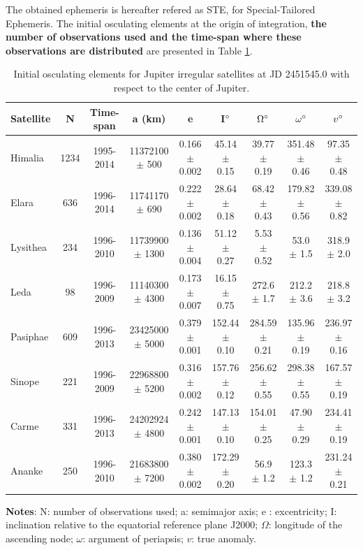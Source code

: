 \documentclass[useAMS,usenatbib]{mn2e}
\begin{document}
The obtained ephemeris is hereafter refered as STE, for Special-Tailored Ephemeris. The initial osculating elements at the origin of integration, \textbf{the number of observations used and the time-span where these observations are distributed} are presented in Table \ref{Tab: sat_ell}.

\begin{table}
\caption{Initial osculating elements for Jupiter irregular satellites at JD 2451545.0 with respect to the center of Jupiter.
 }\label{Tab: sat_ell}
\begin{center}
\begin{tabular}{lcccccccc}
\hline\hline
Satellite & N & Time-span & a (km) & e & I$\hbox{$^\circ$}$ & $\Omega\hbox{$^\circ$}$ & $\omega\hbox{$^\circ$}$ & $v\hbox{$^\circ$}$ \\ 
\hline
Himalia & 1234 & 1995-2014 &   11372100 $\pm$ 500    &    0.166 $\pm$ 0.002      &   45.14 $\pm$ 0.15      &   39.77 $\pm$ 0.19      &   351.48 $\pm$ 0.46      &   97.35 $\pm$ 0.48    \\
Elara & 636 & 1996-2014 &   11741170 $\pm$ 690  &      0.222 $\pm$ 0.002      &   28.64 $\pm$ 0.18      &   68.42 $\pm$ 0.43      &   179.82 $\pm$ 0.56      &   339.08 $\pm$ 0.82  \\
Lysithea & 234 & 1996-2010 &   11739900 $\pm$ 1300  &      0.136 $\pm$ 0.004      &    51.12 $\pm$ 0.27     &   5.53 $\pm$ 0.52      &   53.0 $\pm$ 1.5      &   318.9 $\pm$ 2.0   \\
Leda & 98 & 1996-2009 &   11140300  $\pm$ 4300  &     0.173  $\pm$ 0.007     &   16.15  $\pm$ 0.75    &   272.6  $\pm$ 1.7    &   212.2  $\pm$ 3.6          &   218.8  $\pm$ 3.2  \\
Pasiphae & 609 & 1996-2013 &  23425000  $\pm$ 5000    &     0.379  $\pm$ 0.001       &   152.44 $\pm$ 0.10      &   284.59 $\pm$ 0.21      &   135.96 $\pm$ 0.19      &   236.97 $\pm$ 0.16 \\
Sinope & 221 & 1996-2009 &   22968800 $\pm$ 5200   &     0.316 $\pm$ 0.002      &   157.76 $\pm$ 0.12      &   256.62 $\pm$ 0.55      &   298.38 $\pm$ 0.55      &   167.57 $\pm$ 0.19    \\
Carme & 331 & 1996-2013 &   24202924 $\pm$ 4800      &  0.242 $\pm$ 0.001      &   147.13 $\pm$ 0.10      &   154.01 $\pm$ 0.25      &   47.90 $\pm$ 0.29      &   234.41 $\pm$ 0.19  \\
Ananke & 250 & 1996-2010 &  21683800  $\pm$ 7200  &     0.380 $\pm$ 0.002      &   172.29 $\pm$ 0.20      &   56.9 $\pm$ 1.2      &   123.3 $\pm$ 1.2      &   231.24 $\pm$ 0.21  \\
\hline
\end{tabular} 
\end{center}
\begin{flushleft}
\textbf{Notes}: N: number of observations used; a: semimajor axis; e : excentricity; I: inclination relative to the equatorial reference plane J2000; $\Omega$: longitude of the ascending node; $\omega$: argument of periapsis; $v$: true anomaly.
\end{flushleft}
\end{table}
\end{document}
